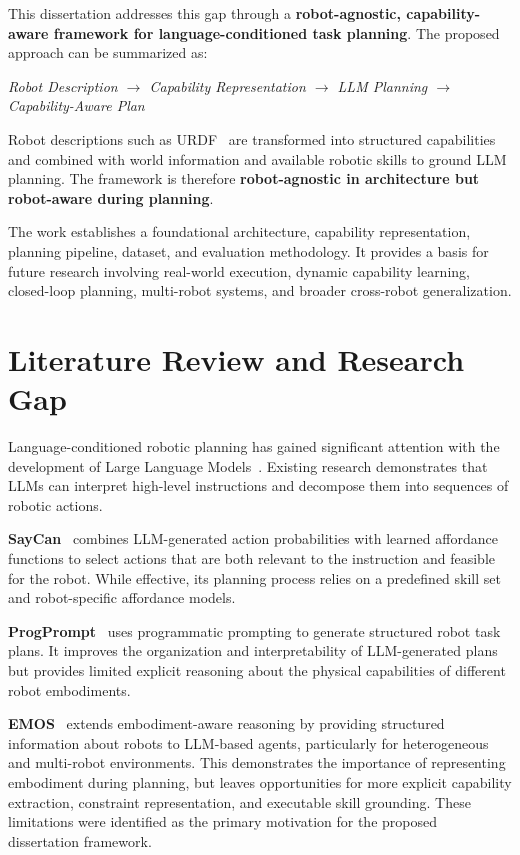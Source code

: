 \documentclass[12pt,a4paper]{article}
\begin{document}
This dissertation addresses this gap through a \textbf{robot-agnostic, capability-aware framework for language-conditioned task planning}.
The proposed approach can be summarized as:

\begin{center}
\textit{Robot Description $\rightarrow$ Capability Representation $\rightarrow$ LLM Planning $\rightarrow$ Capability-Aware Plan}
\end{center}

Robot descriptions such as URDF~\cite{urdf} are transformed into structured capabilities and combined with world information and available robotic skills to ground LLM planning.
The framework is therefore \textbf{robot-agnostic in architecture but robot-aware during planning}.

The work establishes a foundational architecture, capability representation, planning pipeline, dataset, and evaluation methodology.
It provides a basis for future research involving real-world execution, dynamic capability learning, closed-loop planning, multi-robot systems, and broader cross-robot generalization.

\section{Literature Review and Research Gap}

Language-conditioned robotic planning has gained significant attention with the development of Large Language Models~\cite{llm_survey}.
Existing research demonstrates that LLMs can interpret high-level instructions and decompose them into sequences of robotic actions.

\textbf{SayCan}~\cite{saycan} combines LLM-generated action probabilities with learned affordance functions to select actions that are both relevant to the instruction and feasible for the robot.
While effective, its planning process relies on a predefined skill set and robot-specific affordance models.

\textbf{ProgPrompt}~\cite{progprompt} uses programmatic prompting to generate structured robot task plans.
It improves the organization and interpretability of LLM-generated plans but provides limited explicit reasoning about the physical capabilities of different robot embodiments.

\textbf{EMOS}~\cite{emos} extends embodiment-aware reasoning by providing structured information about robots to LLM-based agents, particularly for heterogeneous and multi-robot environments.
This demonstrates the importance of representing embodiment during planning, but leaves opportunities for more explicit capability extraction, constraint representation, and executable skill grounding.
These limitations were identified as the primary motivation for the proposed dissertation framework.
\end{document}
